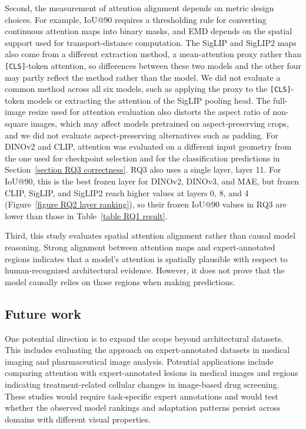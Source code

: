 \documentclass[lineno,pdflatex,sn-mathphys-num]{sn-jnl}%
\theoremstyle{thmstyleone}%
\theoremstyle{thmstyletwo}%
\theoremstyle{thmstylethree}%
\begin{document}
Second, the measurement of attention alignment depends on metric design choices. For example, IoU@90 requires a thresholding rule for converting continuous attention maps into binary masks, and EMD depends on the spatial support used for transport-distance computation. The SigLIP and SigLIP2 maps also come from a different extraction method, a mean-attention proxy rather than \texttt{[CLS]}-token attention, so differences between these two models and the other four may partly reflect the method rather than the model. We did not evaluate a common method across all six models, such as applying the proxy to the \texttt{[CLS]}-token models or extracting the attention of the SigLIP pooling head. The full-image resize used for attention evaluation also distorts the aspect ratio of non-square images, which may affect models pretrained on aspect-preserving crops, and we did not evaluate aspect-preserving alternatives such as padding. For DINOv2 and CLIP, attention was evaluated on a different input geometry from the one used for checkpoint selection and for the classification predictions in Section~\ref{section RQ3 correctness}. RQ3 also uses a single layer, layer 11. For IoU@90, this is the best frozen layer for DINOv2, DINOv3, and MAE, but frozen CLIP, SigLIP, and SigLIP2 reach higher values at layers 0, 8, and 4 (Figure~\ref{figure RQ2 layer ranking}), so their frozen IoU@90 values in RQ3 are lower than those in Table~\ref{table RQ1 result}. 

Third, this study evaluates spatial attention alignment rather than causal model reasoning. Strong alignment between attention maps and expert-annotated regions indicates that a model's attention is spatially plausible with respect to human-recognized architectural evidence. However, it does not prove that the model causally relies on those regions when making predictions. 

\subsection{Future work}

One potential direction is to expand the scope beyond architectural datasets. This includes evaluating the approach on expert-annotated datasets in medical imaging and pharmaceutical image analysis. Potential applications include comparing attention with expert-annotated lesions in medical images and regions indicating treatment-related cellular changes in image-based drug screening. These studies would require task-specific expert annotations and would test whether the observed model rankings and adaptation patterns persist across domains with different visual properties.
\end{document}
